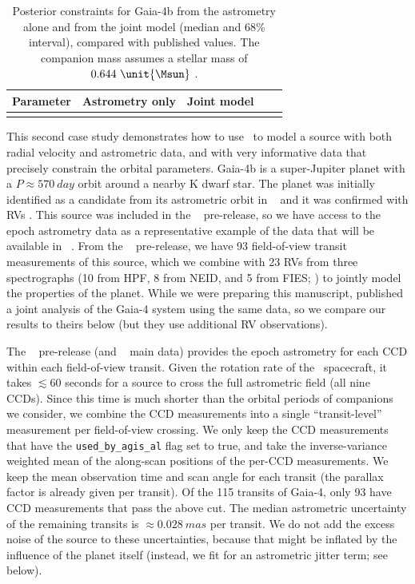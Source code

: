 \documentclass[twocolumn]{AASTeX7/aastex701}
\newcommand{\harv}{\package{harv}}
\begin{document}
\begin{table}
  \centering
  \caption{
    Posterior constraints for Gaia-4b from the astrometry alone and from the joint
    model (median and 68\% interval), compared with published values.
    The companion mass assumes a stellar mass of $0.644~\unit{\Msun}$
    \citep{Stefansson:2025}.
    \label{tab:gaia4}
  }
  \begin{tabular}{lcccc}
    \hline
    Parameter & Astrometry only & Joint model & \citet{Kanodia:2026} &
      \citet{Stefansson:2025} \\
    \hline
    
    \\
    \hline
  \end{tabular}
\end{table}

This second case study demonstrates how to use \harv\ to model a source with both radial
velocity and astrometric data, and with very informative data that precisely constrain
the orbital parameters.
Gaia-4b is a super-Jupiter planet with a $P\approx 570~\unit{day}$ orbit around a nearby
K dwarf star.
The planet was initially identified as a candidate from its astrometric orbit in \gaia\
 and it was confirmed with RVs \citep{Stefansson:2025}.
This source was included in the \gaia\  pre-release, so we have access to the
epoch astrometry data as a representative example of the data that will be available in
\gaia\ .
From the \gaia\ \dr{4} pre-release, we have 93 field-of-view transit measurements of
this source, which we combine with 23 RVs from three spectrographs (10 from HPF, 8 from
NEID, and 5 from FIES; \citealt{Stefansson:2025}) to jointly model the properties of the
planet.
While we were preparing this manuscript, \citet{Kanodia:2026} published a joint analysis
of the Gaia-4 system using the same data, so we compare our results to theirs below (but
they use additional RV observations).

The \gaia\  pre-release (and \gaia\  main data) provides the epoch
astrometry for each CCD within each field-of-view transit.
Given the rotation rate of the \gaia\ spacecraft, it takes $\lesssim 60$ seconds for a
source to cross the full astrometric field (all nine CCDs).
Since this time is much shorter than the orbital periods of companions we consider, we
combine the CCD measurements into a single ``transit-level'' measurement per
field-of-view crossing.
We only keep the CCD measurements that have the \texttt{used\_by\_agis\_al} flag set to
true, and take the inverse-variance weighted mean of the along-scan positions of the
per-CCD measurements.
We keep the mean observation time and scan angle for each transit (the parallax factor
is already given per transit).
Of the 115 transits of Gaia-4, only 93 have CCD measurements that pass the above cut.
The median astrometric uncertainty of the remaining transits is $\approx
0.028~\unit{mas}$ per transit.
We do not add the excess noise of the source to these uncertainties, because that might
be inflated by the influence of the planet itself (instead, we fit for an astrometric
jitter term; see below).
\end{document}
